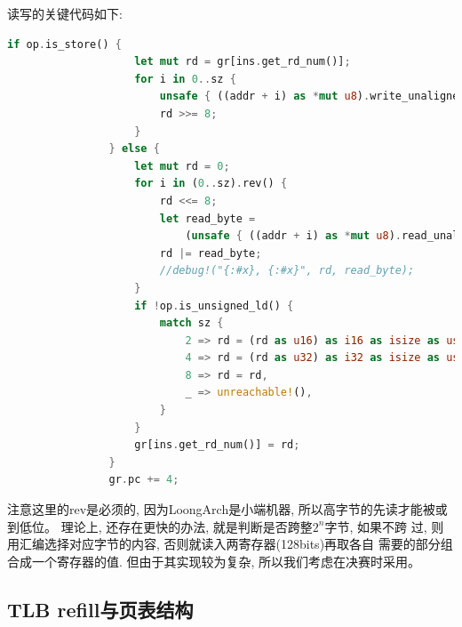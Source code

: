 读写的关键代码如下:
\begin{lstlisting}[language={rust}, label={code:trap},
	caption={la64/trap/trap.S}]
if op.is_store() {
                    let mut rd = gr[ins.get_rd_num()];
                    for i in 0..sz {
                        unsafe { ((addr + i) as *mut u8).write_unaligned(rd as u8) };
                        rd >>= 8;
                    }
                } else {
                    let mut rd = 0;
                    for i in (0..sz).rev() {
                        rd <<= 8;
                        let read_byte =
                            (unsafe { ((addr + i) as *mut u8).read_unaligned() } as usize);
                        rd |= read_byte;
                        //debug!("{:#x}, {:#x}", rd, read_byte);
                    }
                    if !op.is_unsigned_ld() {
                        match sz {
                            2 => rd = (rd as u16) as i16 as isize as usize,
                            4 => rd = (rd as u32) as i32 as isize as usize,
                            8 => rd = rd,
                            _ => unreachable!(),
                        }
                    }
                    gr[ins.get_rd_num()] = rd;
                }
                gr.pc += 4;
\end{lstlisting}

注意这里的rev是必须的, 因为LoongArch是小端机器, 所以高字节的先读才能被或到低位。
理论上, 还存在更快的办法, 就是判断是否跨整$2^{n}$字节, 如果不跨
过, 则用汇编选择对应字节的内容, 否则就读入两寄存器(128bits)再取各自
需要的部分组合成一个寄存器的值. 但由于其实现较为复杂, 所以我们考虑在决赛时采用。

\subsection{TLB refill与页表结构}
